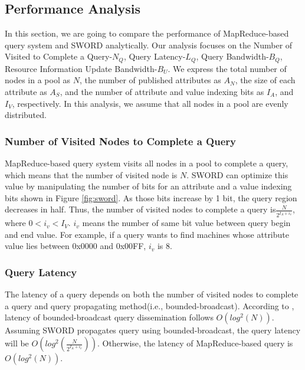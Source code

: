 \documentclass{acm_proc_article-sp}
\begin{document}
\subsection{Performance Analysis}
In this section, we are going to compare the performance of MapReduce-based query system and SWORD analytically. 
Our analysis focuses on the Number of Visited to Complete a Query-$N_Q$, Query Latency-$L_Q$, Query Bandwidth-$B_Q$, Resource Information Update Bandwidth-$B_U$.
We express the total number of nodes in a pool as $N$, the number of published attributes as $A_N$, the size of each attribute as $A_S$, 
and the number of attribute and value indexing bits as $I_A$, and $I_V$, respectively. In this analysis, we assume that all nodes in a pool are evenly distributed.

\subsubsection{Number of Visited Nodes to Complete a Query}
MapReduce-based query system visits all nodes in a pool to complete a query, which means that the number of visited node is $N$.
SWORD can optimize this value by manipulating the number of bits for an attribute and a value indexing bits shown in Figure \ref{fig:sword}. As those bits increase by 1 bit, 
the query region decreases in half. Thus, the number of visited nodes to complete a query is\begin{math}\frac{N}{2^{I_A+i_v}}\end{math}, where \begin{math}0<i_v<I_V\end{math}.
\begin{math}i_v\end{math} means the number of same bit value between query begin and end value. For example, if a query wants to find machines whose attribute value lies between 0x0000 and 0x00FF, \begin{math}i_v\end{math} is 8. 
\subsubsection{Query Latency}
The latency of a query depends on both the number of visited nodes to complete a query and query propagating method(i.e., bounded-broadcast). 
According to \cite{deetoo}, latency of bounded-broadcast query dissemination follows \begin{math}O(log^2(N))\end{math}. Assuming SWORD propagates query using bounded-broadcast,
the query latency will be  \begin{math}O(log^2(\frac{N}{2^{I_A+i_v}}))\end{math}. Otherwise, the latency of MapReduce-based query is  \begin{math}O(log^2(N))\end{math}.
\end{document}
